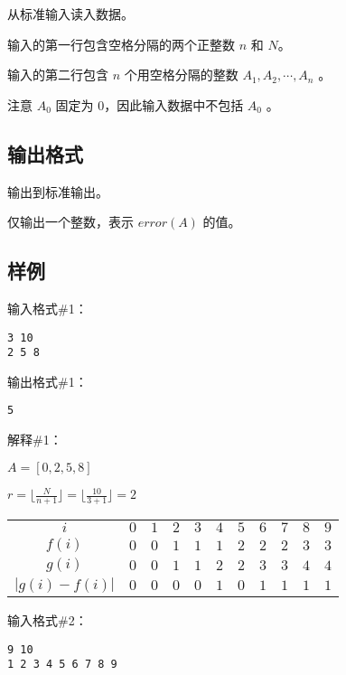 从标准输入读入数据。

输入的第一行包含空格分隔的两个正整数 $n$ 和 $N$。

输入的第二行包含 $n$ 个用空格分隔的整数 $A_1,A_2,\cdots,A_n$
。

注意 $A_0$
 固定为 $0$，因此输入数据中不包括 $A_0$
。

\subsection*{输出格式}

输出到标准输出。

仅输出一个整数，表示 $error(A)$ 的值。

\subsection*{样例}

输入格式\#1：

\begin{lstlisting}
3 10
2 5 8
\end{lstlisting}

输出格式\#1：

\begin{lstlisting}
5
\end{lstlisting}

解释\#1：

$A=[0, 2, 5, 8]$

$r = \lfloor \frac{N}{n+1}\rfloor=\lfloor \frac{10}{3+1}\rfloor=2$

\begin{table}[H]
  \centering
  \begin{tabular}{ccccccccccc}
    \toprule
    $i$ & $0$ & $1$ & $2$ & $3$ & $4$ & $5$ & $6$ & $7$ & $8$ & $9$ \\
    $f(i)$ & $0$ & $0$ & $1$ & $1$ & $1$ & $2$ & $2$ & $2$ & $3$ & $3$ \\
    $g(i)$ & $0$ & $0$ & $1$ & $1$ & $2$ & $2$ & $3$ & $3$ & $4$ & $4$ \\
    $|g(i)-f(i)|$ & $0$ & $0$ & $0$ & $0$ & $1$ & $0$ & $1$ & $1$ & $1$ & $1$ \\
    \bottomrule
  \end{tabular}
\end{table}

输入格式\#2：

\begin{lstlisting}
9 10
1 2 3 4 5 6 7 8 9
\end{lstlisting}

